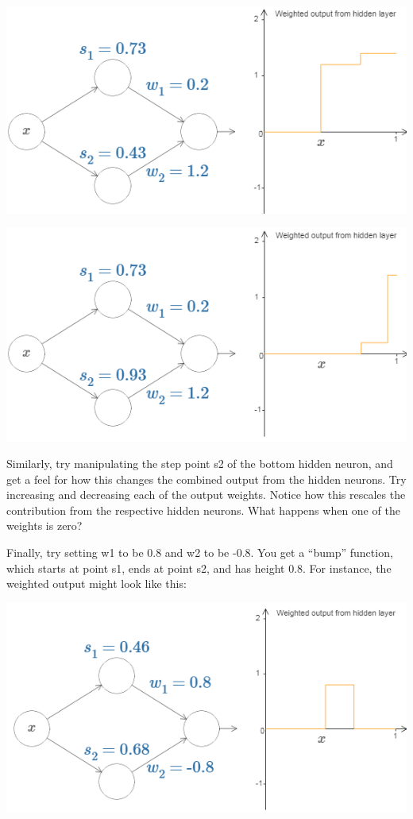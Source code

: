 {\centering \includegraphics[width=\textwidth,]{pic/wigglyfn12.png} \par}

{\centering \includegraphics[width=\textwidth,]{pic/wigglyfn13.png} \par}

Similarly, try manipulating the step point s2 of the bottom hidden neuron, and get a feel for how this changes the combined output from the hidden neurons.
Try increasing and decreasing each of the output weights. Notice how this rescales the contribution from the respective hidden neurons. What happens when one of the weights is zero?

Finally, try setting w1 to be 0.8 and w2 to be -0.8. You get a ``bump'' function, which starts at point s1, ends at point s2, and has height 0.8.
 For instance, the weighted output might look like this:

{\centering \includegraphics[width=\textwidth,]{pic/wigglyfn14.png} \par}

